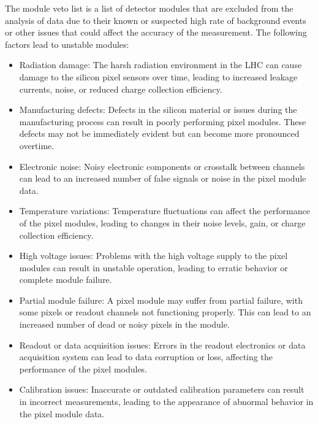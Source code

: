 The module veto list is a list of detector modules that are excluded from the analysis of data due to their known or suspected high rate of background events or other issues that could affect the accuracy of the measurement. The following factors lead to unstable modules: 

\begin{itemize}

\item Radiation damage: The harsh radiation environment in the LHC can cause damage to the silicon pixel sensors over time, leading to increased leakage currents, noise, or reduced charge collection efficiency.

\item Manufacturing defects: Defects in the silicon material or issues during the manufacturing process can result in poorly performing pixel modules. These defects may not be immediately evident but can become more pronounced overtime.

\item Electronic noise: Noisy electronic components or crosstalk between channels can lead to an increased number of false signals or noise in the pixel module data.

\item Temperature variations: Temperature fluctuations can affect the performance of the pixel modules, leading to changes in their noise levels, gain, or charge collection efficiency.

\item High voltage issues: Problems with the high voltage supply to the pixel modules can result in unstable operation, leading to erratic behavior or complete module failure.

\item Partial module failure: A pixel module may suffer from partial failure, with some pixels or readout channels not functioning properly. This can lead to an increased number of dead or noisy pixels in the module.

\item Readout or data acquisition issues: Errors in the readout electronics or data acquisition system can lead to data corruption or loss, affecting the performance of the pixel modules.

\item Calibration issues: Inaccurate or outdated calibration parameters can result in incorrect measurements, leading to the appearance of abnormal behavior in the pixel module data.


\end{itemize}
